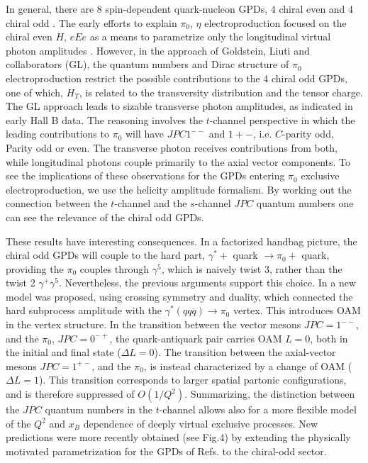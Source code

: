     \fi
    
    
    \iffalse
    In general, there are 8 spin-dependent quark-nucleon GPDs, 4 chiral even and 4 chiral odd \parencite{8}. The early efforts to explain $\pi_0$, $\eta$ electroproduction focused on the chiral even $H$, $e Ee$ as a means to parametrize only the longitudinal virtual photon amplitudes \parencite{7}. However, in the approach of Goldstein, Liuti and collaborators \parencite{9} (GL), the quantum numbers and Dirac structure of $\pi_0$ electroproduction restrict the possible contributions to the 4 chiral odd GPDs, one of which, $H_T$, is related to the transversity distribution and the tensor charge. The GL approach leads to sizable transverse photon amplitudes, as indicated in early Hall B data. The reasoning involves the $t$-channel perspective in which the leading contributions to $\pi_0$ will have $J P C 1^{-−}$ and $1+−$, i.e. $C$-parity odd, Parity odd or even. The transverse photon receives contributions from both, while longitudinal photons couple primarily to the axial vector components. To see the implications of these observations for the GPDs entering $\pi_0$ exclusive electroproduction, we use the helicity amplitude formalism. By working out the connection between the $t$-channel and the $s$-channel $J P C$ quantum numbers one can see the relevance of the chiral odd GPDs.
    
    These results have interesting consequences. In a factorized handbag picture, the chiral odd GPDs will couple to the hard part, $\gamma^{*} +$ quark $\rightarrow \pi_0 +$ quark, providing the $\pi_0$ couples through $\gamma^5$, which is naively twist 3, rather than the twist 2 $\gamma^+ \gamma^5$. Nevertheless, the previous arguments support this choice. In \parencite{9} a new model was proposed, using crossing symmetry and duality, which connected the hard subprocess amplitude with the $\gamma^{*}(qq\overline{q}) \rightarrow \pi_0$ vertex. This introduces OAM in the vertex structure. In the transition between the vector mesons $J P C = 1^{−−}$, and the $\pi_0$, $J P C = 0^{−+}$, the quark-antiquark pair carries OAM $L = 0$, both in the initial and final state ($\Delta L = 0$). The transition between the axial-vector mesons $J P C = 1^{+−}$, and the $\pi_0$, is instead characterized by a change of OAM ($\Delta L = 1$). This transition corresponds to larger spatial partonic configurations, and is therefore suppressed of $O(1/Q^2)$. Summarizing, the distinction between the $J P C$ quantum numbers in the $t$-channel allows also for a more flexible model of the $Q^2$ and $x_B$ dependence of deeply virtual exclusive processes. New predictions were more recently obtained (see Fig.4) by extending the physically motivated parametrization for the GPDs of Refs.\parencite{11, 25} to the chiral-odd sector.
    
